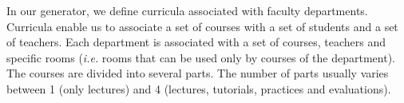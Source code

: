  




In our generator, we define curricula associated with faculty departments.
Curricula enable us to associate a set of courses with a set of students and a set of teachers.
Each department is associated with a set of courses, teachers and specific rooms (\emph{i.e.} rooms that can be used only by courses of the department).
%
%
The courses are divided into several parts.
The number of parts usually varies between 1 (only lectures) and 4 (lectures, tutorials, practices and evaluations).


